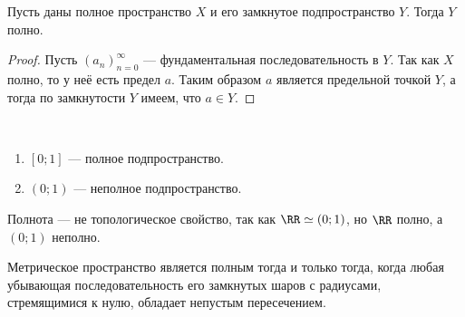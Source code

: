 \documentclass[12pt,a4paper]{article}
\begin{document}
    \begin{theorem}
        Пусть даны полное пространство $X$ и его замкнутое подпространство $Y$. Тогда $Y$ полно.
    \end{theorem}

    \begin{proof}
        Пусть $(a_n)_{n=0}^\infty$ --- фундаментальная последовательность в $Y$. Так как $X$ полно, то у неё есть предел $a$. Таким образом $a$ является предельной точкой $Y$, а тогда по замкнутости $Y$ имеем, что $a \in Y$.
    \end{proof}

    \begin{example}\ 
        \begin{multicols}{2}
            \begin{enumerate}
                \item $[0;1]$ --- полное подпространство.
                \item $(0;1)$ --- неполное подпространство.
            \end{enumerate}
        \end{multicols}
    \end{example}

    \begin{corollary}
        Полнота --- не топологическое свойство, так как $\RR \simeq (0; 1)$, но $\RR$ полно, а $(0; 1)$ неполно.
    \end{corollary}

    \begin{theorem}
        Метрическое пространство является полным тогда и только тогда, когда любая убывающая последовательность его замкнутых шаров с радиусами, стремящимися к нулю, обладает непустым пересечением.
    \end{theorem}
\end{document}
